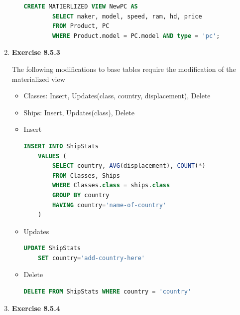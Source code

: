 \documentclass[12pt]{article}
\begin{document}
\begin{enumerate}[1.]
\begin{itemize}
    \begin{lstlisting}[language=SQL]
    CREATE MATIERLIZED VIEW NewPC AS
        SELECT maker, model, speed, ram, hd, price
        FROM Product, PC
        WHERE Product.model = PC.model AND type = 'pc';
    \end{lstlisting}

    \end{itemize}

    \item \textbf{Exercise 8.5.3}

    The following modifications to base tables require the modification of the
    materialized view

    \begin{itemize}
        \item Classes: Insert, Updates(class, country, displacement), Delete
        \item Ships: Insert, Updates(class), Delete
    \end{itemize}

    \begin{itemize}
        \item Insert

    \begin{lstlisting}[language=SQL]
    INSERT INTO ShipStats
    VALUES (
        SELECT country, AVG(displacement), COUNT(*)
        FROM Classes, Ships
        WHERE Classes.class = ships.class
        GROUP BY country
        HAVING country='name-of-country'
    )
    \end{lstlisting}

        \item Updates

    \begin{lstlisting}[language=SQL]
    UPDATE ShipStats
    SET country='add-country-here'
    \end{lstlisting}

        \item Delete

    \begin{lstlisting}[language=SQL]
    DELETE FROM ShipStats WHERE country = 'country'
    \end{lstlisting}

    \end{itemize}

    \item \textbf{Exercise 8.5.4}

\end{enumerate}
\end{document}
